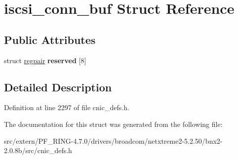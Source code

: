 \hypertarget{structiscsi__conn__buf}{
\section{iscsi\_\-conn\_\-buf Struct Reference}
\label{structiscsi__conn__buf}
}
\subsection*{Public Attributes}
\begin{DoxyCompactItemize}
\item 
\hypertarget{structiscsi__conn__buf_a6c39c94b318866f88be167221d4eea16}{
struct \hyperlink{structregpair}{regpair} {\bfseries reserved} \mbox{[}8\mbox{]}}
\label{structiscsi__conn__buf_a6c39c94b318866f88be167221d4eea16}

\end{DoxyCompactItemize}


\subsection{Detailed Description}


Definition at line 2297 of file cnic\_\-defs.h.



The documentation for this struct was generated from the following file:\begin{DoxyCompactItemize}
\item 
src/extern/PF\_\-RING-\/4.7.0/drivers/broadcom/netxtreme2-\/5.2.50/bnx2-\/2.0.8b/src/cnic\_\-defs.h\end{DoxyCompactItemize}
